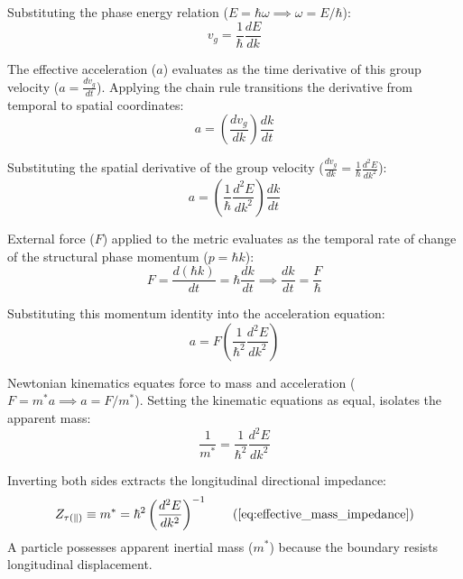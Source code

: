 Substituting the phase energy relation ($E = \hbar \omega \implies \omega = E/\hbar$):
\begin{equation}
    v_g = \frac{1}{\hbar} \frac{dE}{dk} 
\end{equation}

The effective acceleration ($a$) evaluates as the time derivative of this group velocity ($a = \frac{dv_g}{dt}$). Applying the chain rule transitions the derivative from temporal to spatial coordinates:
\begin{equation}
    a = \left( \frac{dv_g}{dk} \right) \frac{dk}{dt} 
\end{equation}

Substituting the spatial derivative of the group velocity ($\frac{dv_g}{dk} = \frac{1}{\hbar} \frac{d^2 E}{dk^2}$):
\begin{equation}
    a = \left( \frac{1}{\hbar} \frac{d^2 E}{dk^2} \right) \frac{dk}{dt} 
\end{equation}

External force ($F$) applied to the metric evaluates as the temporal rate of change of the structural phase momentum ($p = \hbar k$):
\begin{equation}
    F = \frac{d(\hbar k)}{dt} = \hbar \frac{dk}{dt} \implies \frac{dk}{dt} = \frac{F}{\hbar} 
\end{equation}

Substituting this momentum identity into the acceleration equation:
\begin{equation}
    a = F \left( \frac{1}{\hbar^2} \frac{d^2 E}{dk^2} \right) 
\end{equation}

Newtonian kinematics equates force to mass and acceleration ($F = m^* a \implies a = F/m^*$). Setting the kinematic equations as equal, isolates the apparent mass:
\begin{equation}
    \frac{1}{m^*} = \frac{1}{\hbar^2} \frac{d^2 E}{dk^2} 
\end{equation}

Inverting both sides extracts the longitudinal directional impedance:
\begin{equation}
    Z_{\tau(\parallel)} \equiv m^* = \hbar^2 \left( \frac{d^2 E}{dk^2} \right)^{-1} \tag{\ref{eq:effective_mass_impedance}}
\end{equation}
A particle possesses apparent inertial mass ($m^*$) because the boundary resists longitudinal displacement. 

\vspace{0.2 cm}

